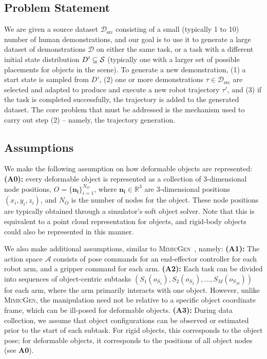 \documentclass[letterpaper, 10 pt, conference]{ieeeconf}  %
\newcommand{\MimicGen}{\textsc{MimicGen}\xspace}
\begin{document}
\subsection{Problem Statement}
\label{subsec:problem}


We are given a source dataset $\mathcal{D}_{\text{src}}$ consisting of a small (typically 1 to 10) number of human demonstrations, and our goal is to use it to generate a large dataset of demonstrations $\mathcal{D}$ on either the same task, or a task with a different initial state distribution $D' \subseteq {\cal S}$ (typically one with a larger set of possible placements for objects in the scene). To generate a new demonstration, (1) a start state is sampled from $D'$, (2) one or more demonstrations $\tau \in \mathcal{D}_{\text{src}}$ are selected and adapted to produce and execute a new robot trajectory $\tau'$, and (3) if the task is completed successfully, the trajectory is added to the generated dataset. The core problem that must be addressed is the mechanism used to carry out step (2) -- namely, the trajectory generation.


\subsection{Assumptions}
\label{subsec:assumptions}


We make the following assumption on how deformable objects are represented: \textbf{(A0):} every deformable object is represented as a collection of 3-dimensional node positions, $O = \{\mathbf{n_i}\}_{i=1}^{N_{O}}$, where $\mathbf{n_i} \in \mathbb{R}^3$ are 3-dimensional positions $(x_i, y_i, z_i)$, and $N_O$ is the number of nodes for the object. These node positions are typically obtained through a simulator's soft object solver. Note that this is equivalent to a point cloud representation for objects, and rigid-body objects could also be represented in this manner.


We also make additional assumptions, similar to \MimicGen~\cite{mandlekar2023mimicgen}, namely: \textbf{(A1):} The action space $\mathcal{A}$ consists of pose commands for an end-effector controller for each robot arm, and a gripper command for each arm. \textbf{(A2):} Each task can be divided into sequences of object-centric subtasks $(S_1(o_{S_1}), S_2(o_{S_2}), ..., S_M(o_{S_M}))$ for each arm, where the arm primarily interacts with one object. However, unlike \MimicGen, the manipulation need not be relative to a specific object coordinate frame, which can be ill-posed for deformable objects. \textbf{(A3):} During data collection, we assume that object configurations can be observed or estimated prior to the start of each subtask. For rigid objects, this corresponds to the object pose; for deformable objects, it corresponds to the positions of all object nodes (see \textbf{A0}).
\end{document}
